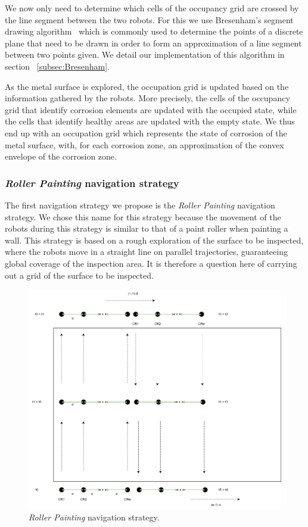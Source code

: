 \documentclass[english,RandD]{rapportPFE}  %
\begin{document}
				We now only need to determine which cells of the occupancy grid are crossed by the line segment between the two robots.
				For this we use Bresenham's segment drawing algorithm~\cite{enwiki:1155124335} which is commonly used to determine the points of a discrete plane that need to be drawn in order to form an approximation of a line segment between two points given.
				We detail our implementation of this algorithm in section ~\ref{subsec:Bresenham}.

				As the metal surface is explored, the occupation grid is updated based on the information gathered by the robots.
				More precisely, the cells of the occupancy grid that identify corrosion elements are updated with the occupied state, while the cells that identify healthy areas are updated with the empty state.
				We thus end up with an occupation grid which represents the state of corrosion of the metal surface, with, for each corrosion zone, an approximation of the convex envelope of the corrosion zone.
			\subsubsection*{\textit{Roller Painting} navigation strategy}
				The first navigation strategy we propose is the \textit{Roller Painting} navigation strategy.
				We chose this name for this strategy because the movement of the robots during this strategy is similar to that of a paint roller when painting a wall.
				This strategy is based on a rough exploration of the surface to be inspected, where the robots move in a straight line on parallel trajectories, guaranteeing global coverage of the inspection area.
				It is therefore a question here of carrying out a grid of the surface to be inspected.

				\begin{figure}[h!]
					\centering
					\includegraphics[scale=0.5]{graphics/peinture_au_rouleau.png}
					\caption{\textit{Roller Painting} navigation strategy.}
					\label{fig:peinture_au_rouleau}
				\end{figure}
\end{document}
